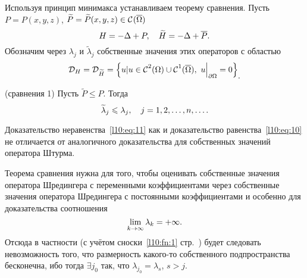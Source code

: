 Используя принцип минимакса устанавливаем теорему сравнения. Пусть $P=P(x,y,z)$, $\widetilde{P}\?=\widetilde{P}(x,y,z)\in\Cfn{}(\overline{\Omega})$
\begin{equation*}
	\hfill H=-\Delta+P,\quad \widetilde{H}=-\Delta+\overline{P}.\hfill
\end{equation*}
Обозначим через $\lambda_j$ и $\widetilde{\lambda}_j$ собственные значения этих операторов с областью 
\begin{equation*}
	\hfill\mc{D}_{H}=\mc{D}_{\widetilde{H}}=\left\{u|u\in\Cfn{2}(\Omega)\cup\Cfn{1}(\overline{\Omega}),\ u\Big|_{\partial \Omega}=0\right\}_{\displaystyle.}\hfill
\end{equation*}
\begin{_teor}(сравнения 1)\label{l10:teor:sr1}
	Пусть $\widetilde{P}\leqslant P$. Тогда 
	\begin{equation}\label{l10:eq:11}
		\hfill\widetilde{\lambda}_j\leqslant\lambda_j,\quad j=1,2,\ldots,n,\ldots.\hfill
	\end{equation}
\end{_teor}
Доказательство неравенства~\eqref{l10:eq:11} как и доказательство равенства~\eqref{l10:eq:10} не отличается от аналогичного доказательства для собственных значений оператора Штурма.

Теорема сравнения нужна для того, чтобы оценивать собственные значения оператора Шредингера с переменными коэффициентами через собственные значения оператора Шредингера с постоянными коэффициентами и особенно для доказательства соотношения
\begin{equation*}
	\hfill\lim\limits_{k\to\infty}\lambda_k=+\infty.\hfill
\end{equation*}
Отсюда в частности (с учётом сноски~\ref{l10:fn:1} стр.~\pageref{l10:fn:1}) будет следовать невозможность того, что размерность какого-то собственного подпространства бесконечна, ибо тогда $\exists j_0$ так, что $\lambda_{j_0}=\lambda_s$, $s>j$.

